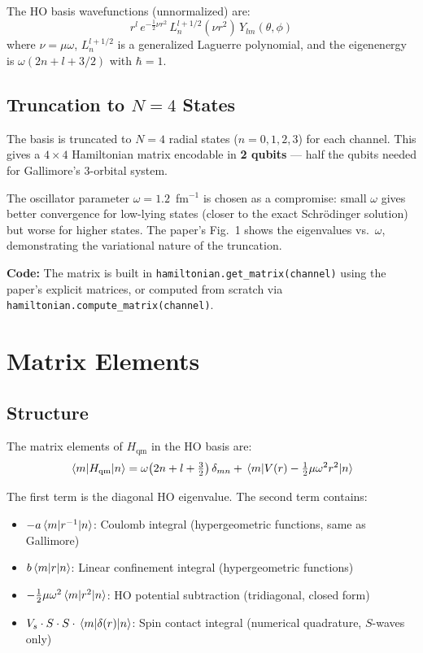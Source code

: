 \documentclass[11pt,a4paper]{article}
\begin{document}
The HO basis wavefunctions (unnormalized) are:
\begin{equation}
  r^l \, e^{-\frac{1}{2}\nu r^2} \, L_n^{l+1/2}(\nu r^2) \, Y_{lm}(\theta,\phi)
\end{equation}
where $\nu = \mu\omega$, $L_n^{l+1/2}$ is a generalized Laguerre polynomial, and the eigenenergy is $\omega(2n + l + 3/2)$ with $\hbar = 1$.

\subsection{Truncation to $N=4$ States}

The basis is truncated to $N=4$ radial states ($n = 0, 1, 2, 3$) for each channel. This gives a $4 \times 4$ Hamiltonian matrix encodable in \textbf{2 qubits} --- half the qubits needed for Gallimore's 3-orbital system.

The oscillator parameter $\omega = 1.2$~fm$^{-1}$ is chosen as a compromise: small $\omega$ gives better convergence for low-lying states (closer to the exact Schr\"odinger solution) but worse for higher states. The paper's Fig.~1 shows the eigenvalues vs.\ $\omega$, demonstrating the variational nature of the truncation.

\vspace{0.3em}
\noindent\textbf{Code:} The matrix is built in \texttt{hamiltonian.get\_matrix(channel)} using the paper's explicit matrices, or computed from scratch via \texttt{hamiltonian.compute\_matrix(channel)}.


\section{Matrix Elements}

\subsection{Structure}

The matrix elements of $H_{\text{qm}}$ in the HO basis are:
\begin{equation}
  \mel{m}{H_{\text{qm}}}{n} = \omega\!\left(2n + l + \tfrac{3}{2}\right)\delta_{mn}
    + \mel{m}{V(r) - \tfrac{1}{2}\mu\omega^2 r^2}{n}
\end{equation}

The first term is the diagonal HO eigenvalue. The second term contains:
\begin{itemize}[nosep]
  \item $-a\mel{m}{r^{-1}}{n}$: Coulomb integral (hypergeometric functions, same as Gallimore)
  \item $b\mel{m}{r}{n}$: Linear confinement integral (hypergeometric functions)
  \item $-\frac{1}{2}\mu\omega^2\mel{m}{r^2}{n}$: HO potential subtraction (tridiagonal, closed form)
  \item $V_s \cdot S \cdot S \cdot \mel{m}{\delta(r)}{n}$: Spin contact integral (numerical quadrature, $S$-waves only)
\end{itemize}
\end{document}
